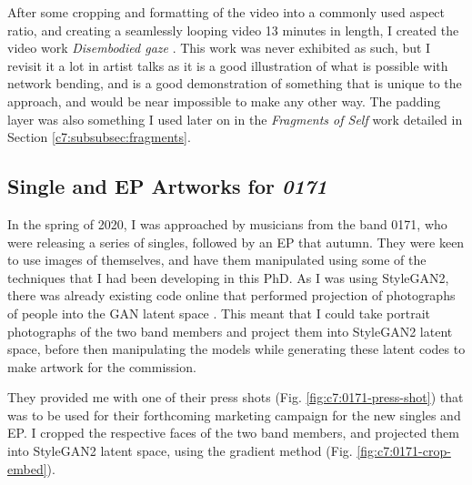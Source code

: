 After some cropping and formatting of the video into a commonly used aspect ratio, and creating a seamlessly looping video 13 minutes in length, I created the video work \textit{Disembodied gaze} \citep{broad2020disembodied}. 
This work was never exhibited as such, but I revisit it a lot in artist talks as it is a good illustration of what is possible with network bending, and is a good demonstration of something that is unique to the approach, and would be near impossible to make any other way. 
The padding layer was also something I used later on in the \textit{Fragments of Self} work detailed in Section \ref{c7:subsubsec:fragments}.

\subsection{Single and EP Artworks for \textit{0171}}
\label{c7:subsubsec:0171}

In the spring of 2020, I was approached by musicians from the band 0171, who were releasing a series of singles, followed by an EP that autumn. 
They were keen to use images of themselves, and have them manipulated using some of the techniques that I had been developing in this PhD.
As I was using StyleGAN2, there was already existing code online that performed projection of photographs of people into the GAN latent space \citep{abdal2019image2stylegan}.
This meant that I could take portrait photographs of the two band members and project them into StyleGAN2 latent space, before then manipulating the models while generating these latent codes to make artwork for the commission. 

They provided me with one of their press shots  (Fig. \ref{fig:c7:0171-press-shot})  that was to be used for their forthcoming marketing campaign for the new singles and EP. 
I cropped the respective faces of the two band members, and projected them into StyleGAN2 latent space, using the gradient method \citep{abdal2019image2stylegan}  (Fig. \ref{fig:c7:0171-crop-embed}).

